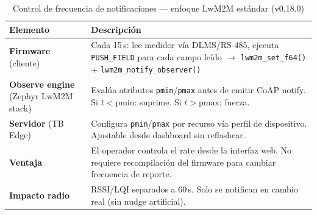 \begin{table}[htbp]
\centering
\caption{Control de frecuencia de notificaciones --- enfoque LwM2M estándar (v0.18.0)}
\label{tab:rate_control_v018}
\begin{tabular}{@{}p{2.5cm}p{11cm}@{}}
\toprule
\textbf{Elemento} & \textbf{Descripción} \\
\midrule
\textbf{Firmware} (cliente) & Cada 15\,s: lee medidor vía DLMS/RS-485, ejecuta \texttt{PUSH\_FIELD} para cada campo leído $\rightarrow$ \texttt{lwm2m\_set\_f64()} + \texttt{lwm2m\_notify\_observer()} \\
\addlinespace
\textbf{Observe engine} (Zephyr LwM2M stack) & Evalúa atributos \texttt{pmin}/\texttt{pmax} antes de emitir CoAP notify. Si $t < \text{pmin}$: suprime. Si $t > \text{pmax}$: fuerza. \\
\addlinespace
\textbf{Servidor} (TB Edge) & Configura \texttt{pmin}/\texttt{pmax} por recurso vía perfil de dispositivo. Ajustable desde dashboard sin reflashear. \\
\addlinespace
\textbf{Ventaja} & El operador controla el rate desde la interfaz web. No requiere recompilación del firmware para cambiar frecuencia de reporte. \\
\addlinespace
\textbf{Impacto radio} & RSSI/LQI separados a 60\,s. Solo se notifican en cambio real (sin nudge artificial). \\
\bottomrule
\end{tabular}
\end{table}
